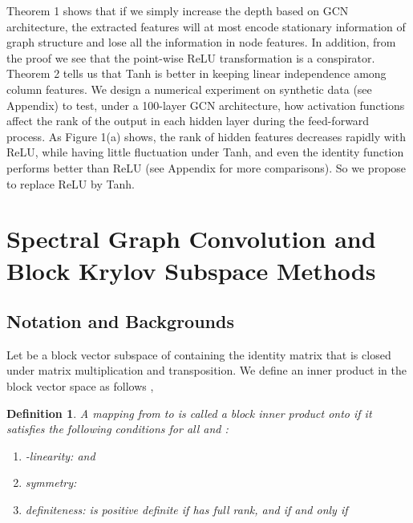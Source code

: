\documentclass{article}
\newtheorem{definition}{Definition}
\begin{document}
Theorem 1 shows that if we simply increase the depth based on GCN architecture, the extracted features  will at most encode stationary information of graph structure and lose all the information in node features. In addition, from the proof we see that the point-wise ReLU transformation is a conspirator. Theorem 2 tells us that Tanh is better in keeping linear independence among column features. We design a numerical experiment on synthetic data (see Appendix) to test, under a 100-layer GCN architecture, how activation functions affect the rank of the output in each hidden layer during the feed-forward process. As Figure 1(a) shows, the rank of hidden features decreases rapidly with ReLU, while having little fluctuation under Tanh, and even the identity function performs better than ReLU (see Appendix for more comparisons). So we propose to replace ReLU by Tanh.\begin{figure*}[htbp]
\centering
{}}
\hfill
\subfloat[Snowball]{
\captionsetup{justification = centering}
\texttt{[image: \{fig\_snowball\_compare]}.pdf}}
\hfill
\subfloat[Truncated Block Krylov]{
\captionsetup{justification = centering}
\texttt{[image: \{fig\_truncated\_krylov\_compare]}.pdf}}
\caption{Number of independent column features }
\label{activation_functions}
\end{figure*}
\section{Spectral Graph Convolution and Block Krylov Subspace Methods}
\subsection{Notation and Backgrounds}
Let  be a block vector subspace of  containing the identity matrix  that is closed under matrix multiplication and transposition. We define an inner product  in the block vector space  as follows \cite{frommer2017block},
\begin{definition}
A mapping  from  to  is called a block inner product onto  if it satisfies the following conditions for all  and :
\begin{enumerate}[leftmargin=12pt]
\item -linearity:   and 
\item symmetry: 
\item definiteness:  is positive definite if  has full rank, and  if and only if 
\end{enumerate}
\end{definition}
\end{document}
